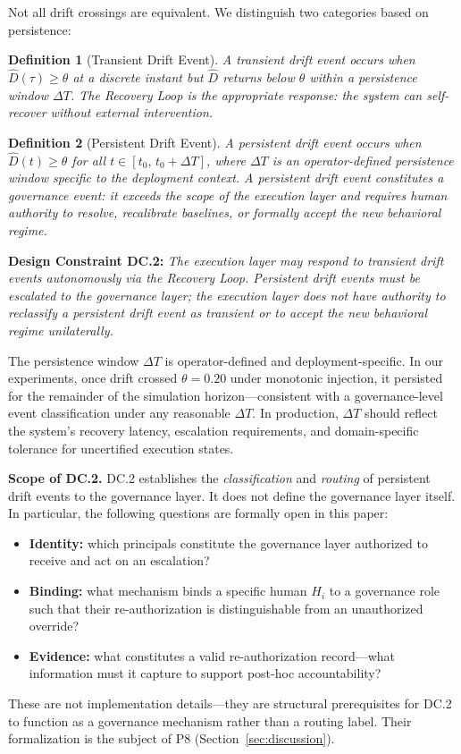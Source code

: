 \documentclass[11pt]{article}
\newtheorem{definition}{Definition}[section]
\newcommand{\Dhat}{\widehat{D}}
\begin{document}
Not all drift crossings are equivalent. We distinguish two categories
based on persistence:

\begin{definition}[Transient Drift Event]
A \emph{transient drift event} occurs when $\Dhat(\tau) \geq \theta$
at a discrete instant but $\Dhat$ returns below $\theta$ within
a persistence window $\Delta T$. The Recovery Loop is the appropriate
response: the system can self-recover without external intervention.
\end{definition}

\begin{definition}[Persistent Drift Event]
\label{def:persistent}
A \emph{persistent drift event} occurs when $\Dhat(t) \geq \theta$
for all $t \in [t_0,\, t_0 + \Delta T]$, where $\Delta T$ is an
operator-defined persistence window specific to the deployment context.
A persistent drift event constitutes a \emph{governance event}: it
exceeds the scope of the execution layer and requires human authority
to resolve, recalibrate baselines, or formally accept the new
behavioral regime.
\end{definition}

\textbf{Design Constraint DC.2:} \emph{The execution layer may respond
to transient drift events autonomously via the Recovery Loop.
Persistent drift events must be escalated to the governance layer;
the execution layer does not have authority to reclassify a persistent
drift event as transient or to accept the new behavioral regime
unilaterally.}

The persistence window $\Delta T$ is operator-defined and
deployment-specific. In our experiments, once drift crossed
$\theta = 0.20$ under monotonic injection, it persisted for the
remainder of the simulation horizon---consistent with a governance-level
event classification under any reasonable $\Delta T$. In production,
$\Delta T$ should reflect the system's recovery latency, escalation
requirements, and domain-specific tolerance for uncertified execution
states.

\textbf{Scope of DC.2.}
DC.2 establishes the \emph{classification} and \emph{routing} of persistent
drift events to the governance layer.
It does not define the governance layer itself.
In particular, the following questions are formally open in this paper:
\begin{itemize}[leftmargin=2em, topsep=2pt]
  \item \textbf{Identity:} which principals constitute the governance layer
        authorized to receive and act on an escalation?
  \item \textbf{Binding:} what mechanism binds a specific human $H_i$ to a
        governance role such that their re-authorization is distinguishable
        from an unauthorized override?
  \item \textbf{Evidence:} what constitutes a valid re-authorization
        record---what information must it capture to support post-hoc
        accountability?
\end{itemize}
These are not implementation details---they are structural prerequisites for
DC.2 to function as a governance mechanism rather than a routing label.
Their formalization is the subject of P8 (Section~\ref{sec:discussion}).
\end{document}

